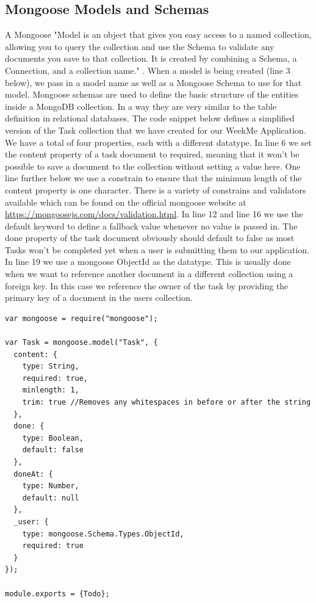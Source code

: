 \documentclass[11pt]{article}
\begin{document}
\subsection{Mongoose Models and Schemas} 
A Mongoose "Model is an object that gives you easy access to a named collection, allowing you to query the collection and use the Schema to validate any documents you save to that collection. It is created by combining a Schema, a Connection, and a collection name." \cite{mongoosemodelstackoverflow}. When a model is being created (line 3 below), we pass in a model name as well as a Mongoose Schema to use for that model.  
Mongoose schemas are used to define the basic structure of the entities inside a MongoDB collection. In a way they are very similar to the table definition in relational databases. The code snippet below defines a simplified version of the Task collection that we have created for our WeekMe Application. We have a total of four properties, each with a different datatype. In line 6 we set the content property of a task document to required, meaning that it won't be possible to save a document to the collection without setting a value here. One line further below we use a constrain to ensure that the minimum length of the content property is one character. There is a variety of constrains and validators available which can be found on the official mongoose website at \url{https://mongoosejs.com/docs/validation.html}. In line 12 and line 16 we use the default keyword to define a fallback value whenever no value is passed in. The done property of the task document obviously should default to false as most Tasks won't be completed yet when a user is submitting them to our application. In line 19 we use a mongoose ObjectId as the datatype. This is usually done when we want to reference another document in a different collection using a foreign key. In this case we reference the owner of the task by providing the primary key of a document in the users collection.      

\begin{lstlisting}
var mongoose = require("mongoose");

var Task = mongoose.model("Task", {
  content: {
    type: String,
    required: true,
    minlength: 1,
    trim: true //Removes any whitespaces in before or after the string
  },
  done: {
    type: Boolean,
    default: false
  },
  doneAt: {
    type: Number,
    default: null
  },
  _user: {
    type: mongoose.Schema.Types.ObjectId,
    required: true
  }
});

module.exports = {Todo};
\end{lstlisting} 
\end{document}
